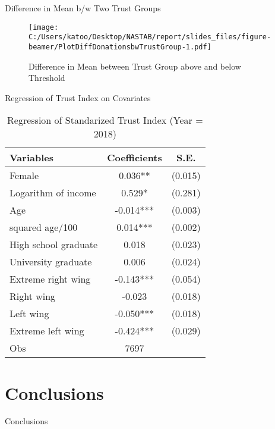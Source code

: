 \documentclass[
  ignorenonframetext,
]{beamer}
\begin{document}
\begin{frame}{Difference in Mean b/w Two Trust Groups}
\protect\hypertarget{difference-in-mean-bw-two-trust-groups}{}
\begin{figure}
\centering
\texttt{[image: C:/Users/katoo/Desktop/NASTAB/report/slides\_files/figure-beamer/PlotDiffDonationsbwTrustGroup-1.pdf]}
\caption{Difference in Mean between Trust Group above and below
Threshold}
\end{figure}
\end{frame}

\begin{frame}{Regression of Trust Index on Covariates}
\protect\hypertarget{regression-of-trust-index-on-covariates}{}
\begin{table}

\caption{\label{tab:kableRegTrustidOnCovariate}Regression of Standarized Trust Index (Year = 2018)}
\centering
\begin{tabular}[t]{lcc}
\toprule
Variables & Coefficients & S.E.\\
\midrule
Female & 0.036** & (0.015)\\
Logarithm of income & 0.529* & (0.281)\\
Age & -0.014*** & (0.003)\\
squared age/100 & 0.014*** & (0.002)\\
High school graduate & 0.018 & (0.023)\\
University graduate & 0.006 & (0.024)\\
Extreme right wing & -0.143*** & (0.054)\\
Right wing & -0.023 & (0.018)\\
Left wing & -0.050*** & (0.018)\\
Extreme left wing & -0.424*** & (0.029)\\
Obs & 7697 & \\
\bottomrule
\end{tabular}
\end{table}
\end{frame}

\hypertarget{conclusions}{%
\section{Conclusions}\label{conclusions}}

\begin{frame}{Conclusions}
\protect\hypertarget{conclusions-1}{}
\end{frame}
\end{document}
